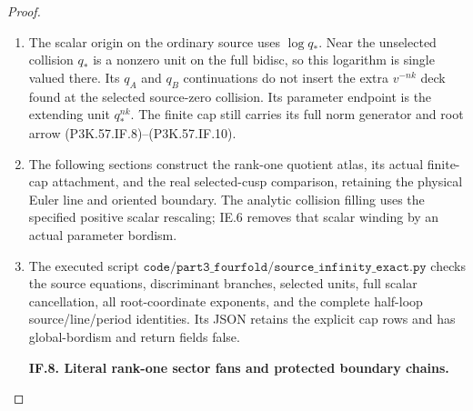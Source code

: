 \begin{proof}
\begin{enumerate}[label=\arabic*.]
\par\medskip\noindent\textbf{IF.7. The actual origin and the attachment sequence.}\par\nopagebreak[4]

\item The scalar origin on the ordinary source uses \(\log q_*\). Near the
unselected collision \(q_*\) is a nonzero unit on the full bidisc, so this
logarithm is single valued there. Its \(q_A\) and \(q_B\) continuations do
not insert the extra \(v^{-nk}\) deck found at the selected source-zero
collision. Its parameter endpoint is the extending unit \(q_*^{nk}\).
The finite cap still carries its full norm generator and root arrow
(P3K.57.IF.8)--\allowbreak (P3K.57.IF.10).

\item The following sections construct the rank-one quotient atlas, its actual finite-cap
attachment, and the real selected-cusp comparison, retaining the physical Euler line
and oriented boundary. The analytic collision filling uses the specified positive
scalar rescaling; IE.6 removes that scalar winding by an actual parameter bordism.

\item The executed script
\(\texttt{code/part3\_fourfold/source\_infinity\_exact.py}\) checks the
source equations, discriminant branches, selected units, full scalar
cancellation, all root-coordinate exponents, and the complete half-loop
source/line/period identities. Its JSON retains the explicit cap rows
and has global-bordism and return fields false.

\par\medskip\noindent\textbf{IF.8. Literal rank-one sector fans and protected boundary chains.}\par\nopagebreak[4]


\end{enumerate}
\end{proof}
